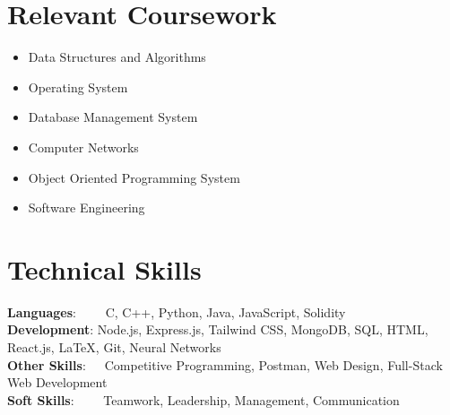 \documentclass[letterpaper,11pt]{article}
\newcommand{\resumeSubHeadingListEnd}{\end{itemize}}
\begin{document}
\section{Relevant Coursework}
    \setlength{\columnsep}{-15pt}
        \begin{multicols}{3}
            \begin{itemize}[itemsep=-3pt, parsep=3pt]
                \item\small Data Structures and Algorithms
                \item Operating System
                \item Database Management System
                \item Computer Networks
                \item Object Oriented Programming System 
                \item Software Engineering
            \end{itemize}
        \end{multicols}
        \vspace*{2.0\multicolsep}
\vspace{5pt}
%
\section{Technical Skills}
 \begin{itemize}[leftmargin=0.15in, label={}]
    \small{\item{
     \textbf{Languages}{:~~~~ C, C++, Python, Java, JavaScript, Solidity} \\ \vspace{3pt}
     \textbf{Development}{: Node.js, Express.js, Tailwind CSS, MongoDB, SQL, HTML, React.js, LaTeX, Git, Neural Networks} \\ \vspace{3pt}
     \textbf{Other Skills}{:~~~Competitive Programming, Postman, Web Design, Full-Stack Web Development} \\ \vspace{3pt}
\textbf{Soft Skills}{:~~~~ Teamwork, Leadership, Management, Communication} \\
    }}
 \end{itemize}
 \vspace{-15pt}
\end{document}
